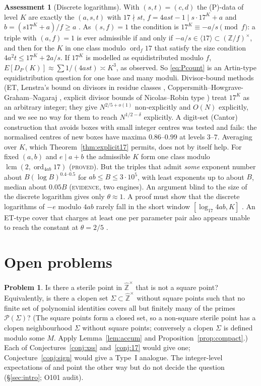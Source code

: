 \documentclass[11pt,reqno]{amsart}
\theoremstyle{definition}
\newtheorem{assessment}[theorem]{Assessment}
\newtheorem{problem}{Problem}
\newcommand{\Z}{\mathbb Z}
\newcommand{\Zhu}{\widehat{\Z}^{\times}}
\newcommand{\status}[1]{\textup{\textsc{#1}}}
\begin{document}
\begin{assessment}[Discrete logarithms]
With $(s,t)=(c,d)$ the (P)-data of level $K$ are exactly the $(a,s,t)$
with $17\nmid st$, $f=4ast-1\mid s\cdot17^K+a$ and
$b=(s17^K+a)/f\ge a$ \cite[\S6]{PM17}.  As $(s,f)=1$ the condition is
$17^K\equiv-a/s\pmod f$: a triple with $(a,f)=1$ is ever admissible if
and only if $-a/s\in\langle17\rangle\subset(\Z/f)^\times$, and then for
the $K$ in one class modulo $\operatorname{ord}_f17$ that satisfy the
size condition $4a^2t\le17^K+2a/s$.  If $17^K$ is modelled as
equidistributed modulo $f$, $E[D_P(K)]\approx\sum1/(4ast)\asymp K^3$, as
observed.  So \eqref{eq:Pcount} is an Artin-type equidistribution
question for one base and many moduli.  Divisor-bound methods (ET,
Lenstra's bound on divisors in residue classes \cite{Lenstra},
Coppersmith--Howgrave-Graham--Nagaraj \cite{CHN}, explicit divisor bounds
of Nicolas--Robin type \cite{NR}) treat $17^K$ as an arbitrary integer; they give
$N^{2/5+o(1)}$ non-explicitly and $O(N)$ explicitly, and we see no way
for them to reach $N^{1/2-\delta}$ explicitly.  A digit-set (Cantor)
construction that avoids boxes with small integer centres was tested and
fails: the normalised centres of new boxes have maxima $0.86$--$0.99$ at
levels $3$--$7$.
Averaging over $K$, which Theorem~\ref{thm:explicit17} permits, does not
by itself help.  For fixed $(a,b)$ and $e\mid a+b$ the admissible $K$
form one class modulo $\operatorname{lcm}(2,\operatorname{ord}_{4ab}17)$
(\status{proved}).  But the triples that admit \emph{some} exponent number
about $B(\log B)^{0.4\text{--}0.5}$ for $ab\le B\le3\cdot10^5$, with
least exponents up to about $B$, median about $0.05B$ (\status{evidence},
two engines).  An argument blind to the size of the discrete logarithm gives
only $\theta\approx1$.  A proof must show that the discrete logarithms of
$-e$ modulo $4ab$ rarely fall in the short window $[\log_{17}4ab,K]$
\cite[\S\S3--4]{PM17C}.  An ET-type cover that charges at least one per
parameter pair also appears unable to reach the constant at $\theta=2/5$
\cite[\S3]{PM17C}.
\end{assessment}

\section{Open problems}\label{sec:open}

\begin{problem}
Is there a sterile point in $\Zhu$ that is not a square point?
Equivalently, is there a clopen set $\Sigma\subset\Zhu$ without square
points such that no finite set of polynomial identities covers all but
finitely many of the primes $\mathcal P(\Sigma)$?  (The square points form
a closed set, so a non-square sterile point has a clopen neighbourhood
$\Sigma$ without square points; conversely a clopen $\Sigma$ is defined
modulo some $M$.  Apply Lemma~\ref{lem:accum} and
Proposition~\ref{prop:compact}.)
Each of Conjectures~\ref{conj:xss} and~\ref{conj:17} would give one;
Conjecture~\ref{conj:sign} would give a Type~I analogue.  The
integer-level expectations of \cite[p.~47]{Yamamoto} and \cite{IW}
point the other way but do not decide the question
(\S\ref{sec:intro}; O101 audit).
\end{problem}
\end{document}
